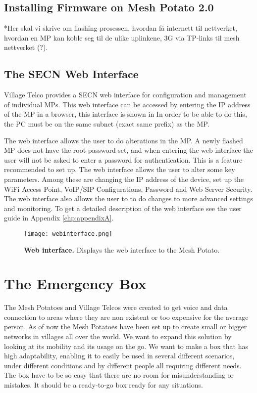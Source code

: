 \subsection{Installing Firmware on Mesh Potato 2.0}
*Her skal vi skrive om flashing prosessen, hvordan få internett til nettverket, hvordan  en MP kan koble seg til de ulike uplinkene, 3G via TP-links til mesh nettverket (?). 



\subsection{The SECN Web Interface}
Village Telco provides a SECN web interface for configuration and management of individual MPs. This web interface can be accessed by entering the IP address of the MP in a browser, this interface is shown in  In order to be able to do this, the PC must be on the same subnet (exact same prefix) as the MP.  

The web interface allows the user to do alterations in the MP. A newly flashed MP does not have the root password set, and when entering the web interface the user will not be asked to enter a password for authentication. This is a feature recommended to set up.  The web interface allows the user to alter some key parameters. Among these are changing the IP address of the device, set up the WiFi Access Point, VoIP/SIP Configurations, Password and Web Server Security. The web interface also allows the user to to do changes to more advanced settings and monitoring. To get a detailed description of the web interface see the user guide in Appendix \ref{chp:appendixA}.  

\begin{figure}[t]
  \centering
      \texttt{[image: webinterface.png]}
  \caption [Web interface]{\textbf{Web interface.} Displays the web interface to the Mesh Potato.}
  \label{fig:webinterface}
\end{figure}


\section{The Emergency Box}
The Mesh Potatoes and Village Telcos were created to get voice and data connection to areas where they are non existent or too expensive for the average person. As of now the Mesh Potatoes have been set up to create small or bigger networks in villages all over the world. We want to expand this solution by looking at its mobility and its usage on the go. We want to make a box that has high adaptability, enabling it to easily be used in several different scenarios, under different conditions and by different people all requiring different needs. The box have to be so easy that there are no room for misunderstanding or mistakes. It should be a ready-to-go box ready for any situations.  
 
